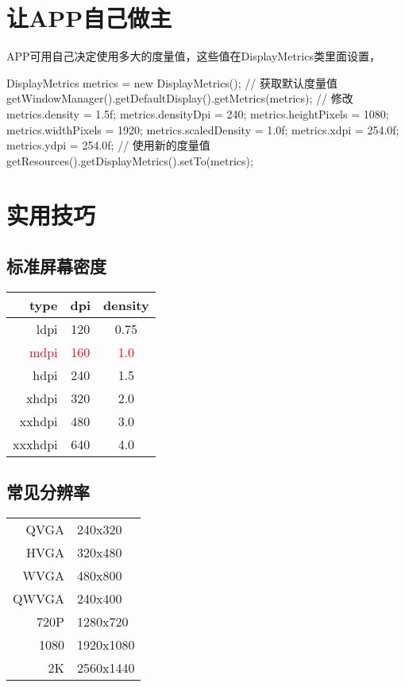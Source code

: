 \documentclass[a4paper,11pt]{article}
\begin{document}
\section[让APP自己做主]{让APP自己做主}

APP可用自己决定使用多大的度量值，这些值在DisplayMetrics类里面设置，

\begin{javacode}
    DisplayMetrics metrics = new DisplayMetrics();
    // 获取默认度量值
    getWindowManager().getDefaultDisplay().getMetrics(metrics);
    // 修改
    metrics.density = 1.5f;
    metrics.densityDpi = 240;
    metrics.heightPixels = 1080;
    metrics.widthPixels = 1920;
    metrics.scaledDensity = 1.0f;
    metrics.xdpi = 254.0f;
    metrics.ydpi = 254.0f;
    // 使用新的度量值
    getResources().getDisplayMetrics().setTo(metrics);
\end{javacode}


\section[实用技巧]{实用技巧}

\subsection[标准屏幕密度]{标准屏幕密度}

\begin{tabular}{r|c|c}
  type    & dpi & density \\\hline
  ldpi    & 120 & 0.75 \\
  \textcolor{red}{mdpi}    & \textcolor{red}{160} & \textcolor{red}{1.0} \\
  hdpi    & 240 & 1.5 \\
  xhdpi   & 320 & 2.0 \\
  xxhdpi  & 480 & 3.0 \\
  xxxhdpi & 640 & 4.0 \\
\end{tabular}

\subsection[常见分辨率]{常见分辨率}

\begin{tabular}{r|l}
  \hline
    QVGA	& 240x320  \\
    HVGA	& 320x480  \\
    WVGA	& 480x800  \\
    QWVGA	& 240x400  \\
    720P	& 1280x720 \\
    1080	& 1920x1080\\
    2K		& 2560x1440\\
  \hline
\end{tabular}
\end{document}
